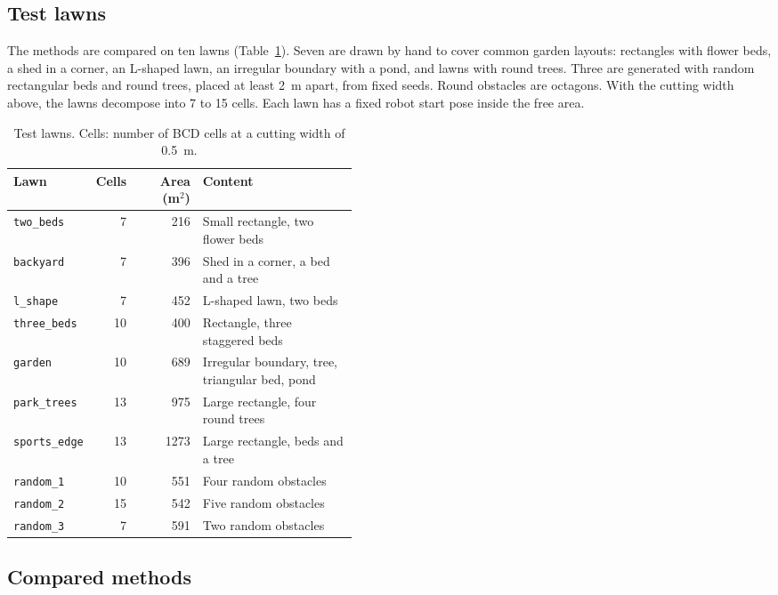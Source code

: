 \subsection{Test lawns}
\label{sec:setup-lawns}

The methods are compared on ten lawns (Table~\ref{tab:lawns}).
Seven are drawn by hand to cover common garden layouts: rectangles with flower beds, a shed in a corner, an L-shaped lawn, an irregular boundary with a pond, and lawns with round trees.
Three are generated with random rectangular beds and round trees, placed at least 2~m apart, from fixed seeds.
Round obstacles are octagons.
With the cutting width above, the lawns decompose into 7 to 15 cells.
Each lawn has a fixed robot start pose inside the free area.

\begin{table}[t]
\centering
\caption{Test lawns. Cells: number of BCD cells at a cutting width of 0.5~m.}
\label{tab:lawns}
\small
\begin{tabular}{l r r p{0.45\linewidth}}
\toprule
Lawn & Cells & Area (m$^2$) & Content \\
\midrule
\texttt{two\_beds} & 7 & 216 & Small rectangle, two flower beds \\
\texttt{backyard} & 7 & 396 & Shed in a corner, a bed and a tree \\
\texttt{l\_shape} & 7 & 452 & L-shaped lawn, two beds \\
\texttt{three\_beds} & 10 & 400 & Rectangle, three staggered beds \\
\texttt{garden} & 10 & 689 & Irregular boundary, tree, triangular bed, pond \\
\texttt{park\_trees} & 13 & 975 & Large rectangle, four round trees \\
\texttt{sports\_edge} & 13 & 1273 & Large rectangle, beds and a tree \\
\texttt{random\_1} & 10 & 551 & Four random obstacles \\
\texttt{random\_2} & 15 & 542 & Five random obstacles \\
\texttt{random\_3} & 7 & 591 & Two random obstacles \\
\bottomrule
\end{tabular}
\end{table}

\subsection{Compared methods}
\label{sec:setup-methods}

